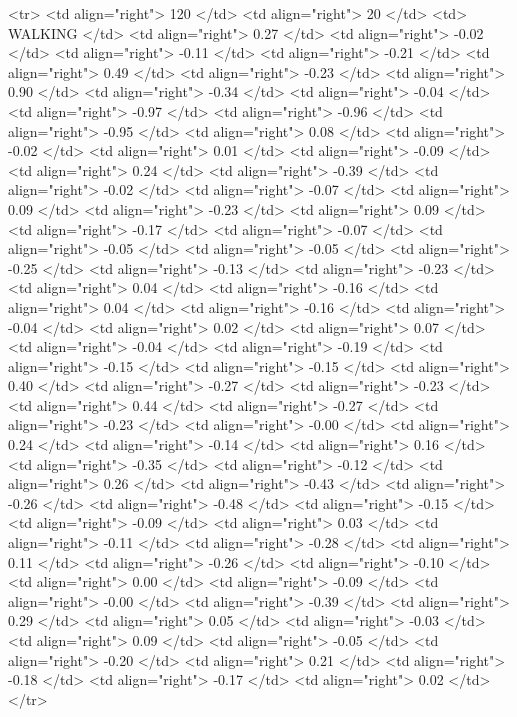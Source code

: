   <tr> <td align="right"> 120 </td> <td align="right">  20 </td> <td> WALKING </td> <td align="right"> 0.27 </td> <td align="right"> -0.02 </td> <td align="right"> -0.11 </td> <td align="right"> -0.21 </td> <td align="right"> 0.49 </td> <td align="right"> -0.23 </td> <td align="right"> 0.90 </td> <td align="right"> -0.34 </td> <td align="right"> -0.04 </td> <td align="right"> -0.97 </td> <td align="right"> -0.96 </td> <td align="right"> -0.95 </td> <td align="right"> 0.08 </td> <td align="right"> -0.02 </td> <td align="right"> 0.01 </td> <td align="right"> -0.09 </td> <td align="right"> 0.24 </td> <td align="right"> -0.39 </td> <td align="right"> -0.02 </td> <td align="right"> -0.07 </td> <td align="right"> 0.09 </td> <td align="right"> -0.23 </td> <td align="right"> 0.09 </td> <td align="right"> -0.17 </td> <td align="right"> -0.07 </td> <td align="right"> -0.05 </td> <td align="right"> -0.05 </td> <td align="right"> -0.25 </td> <td align="right"> -0.13 </td> <td align="right"> -0.23 </td> <td align="right"> 0.04 </td> <td align="right"> -0.16 </td> <td align="right"> 0.04 </td> <td align="right"> -0.16 </td> <td align="right"> -0.04 </td> <td align="right"> 0.02 </td> <td align="right"> 0.07 </td> <td align="right"> -0.04 </td> <td align="right"> -0.19 </td> <td align="right"> -0.15 </td> <td align="right"> -0.15 </td> <td align="right"> 0.40 </td> <td align="right"> -0.27 </td> <td align="right"> -0.23 </td> <td align="right"> 0.44 </td> <td align="right"> -0.27 </td> <td align="right"> -0.23 </td> <td align="right"> -0.00 </td> <td align="right"> 0.24 </td> <td align="right"> -0.14 </td> <td align="right"> 0.16 </td> <td align="right"> -0.35 </td> <td align="right"> -0.12 </td> <td align="right"> 0.26 </td> <td align="right"> -0.43 </td> <td align="right"> -0.26 </td> <td align="right"> -0.48 </td> <td align="right"> -0.15 </td> <td align="right"> -0.09 </td> <td align="right"> 0.03 </td> <td align="right"> -0.11 </td> <td align="right"> -0.28 </td> <td align="right"> 0.11 </td> <td align="right"> -0.26 </td> <td align="right"> -0.10 </td> <td align="right"> 0.00 </td> <td align="right"> -0.09 </td> <td align="right"> -0.00 </td> <td align="right"> -0.39 </td> <td align="right"> 0.29 </td> <td align="right"> 0.05 </td> <td align="right"> -0.03 </td> <td align="right"> 0.09 </td> <td align="right"> -0.05 </td> <td align="right"> -0.20 </td> <td align="right"> 0.21 </td> <td align="right"> -0.18 </td> <td align="right"> -0.17 </td> <td align="right"> 0.02 </td> </tr>
